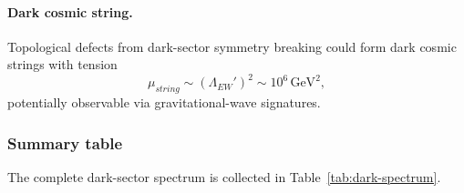 \documentclass[a4paper,1pt,oneside,openany]{book}
\begin{document}
\paragraph{Dark cosmic string.}
Topological defects from dark-sector symmetry breaking could form 
dark cosmic strings with tension
\begin{equation}
\mu_{string}
\sim
(\Lambda_{EW}')^{2}
\sim
10^{6}\,\text{GeV}^{2},
\label{eq:string-tension}
\end{equation}
potentially observable via gravitational-wave signatures.

\subsubsection{Summary table}

The complete dark-sector spectrum is collected in 
Table~\ref{tab:dark-spectrum}.
\end{document}
